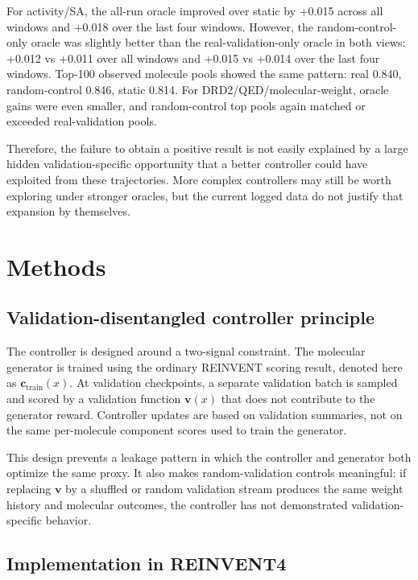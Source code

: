 \documentclass[referee,lineno,pdflatex,sn-basic]{sn-jnl}
\theoremstyle{thmstyleone}%
\theoremstyle{thmstyletwo}%
\theoremstyle{thmstylethree}%
\begin{document}
For activity/SA, the all-run oracle improved over static by +0.015 across all windows and +0.018 over the last four windows. However, the random-control-only oracle was slightly better than the real-validation-only oracle in both views: +0.012 vs +0.011 over all windows and +0.015 vs +0.014 over the last four windows. Top-100 observed molecule pools showed the same pattern: real 0.840, random-control 0.846, static 0.814. For DRD2/QED/molecular-weight, oracle gains were even smaller, and random-control top pools again matched or exceeded real-validation pools.

Therefore, the failure to obtain a positive result is not easily explained by a large hidden validation-specific opportunity that a better controller could have exploited from these trajectories. More complex controllers may still be worth exploring under stronger oracles, but the current logged data do not justify that expansion by themselves.

\section{Methods}\label{sec:methods}

\subsection{Validation-disentangled controller principle}\label{subsec:principle}

The controller is designed around a two-signal constraint. The molecular generator is trained using the ordinary REINVENT scoring result, denoted here as $\mathbf{c}_{\mathrm{train}}(x)$. At validation checkpoints, a separate validation batch is sampled and scored by a validation function $\mathbf{v}(x)$ that does not contribute to the generator reward. Controller updates are based on validation summaries, not on the same per-molecule component scores used to train the generator.

This design prevents a leakage pattern in which the controller and generator both optimize the same proxy. It also makes random-validation controls meaningful: if replacing $\mathbf{v}$ by a shuffled or random validation stream produces the same weight history and molecular outcomes, the controller has not demonstrated validation-specific behavior.

\subsection{Implementation in REINVENT4}\label{subsec:implementation}
\end{document}
